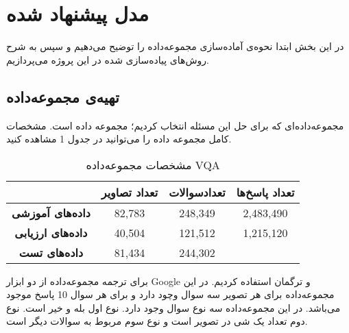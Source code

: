 \section{مدل پیشنهاد شده}
{
	در این بخش ابتدا نحوه‌ی آماده‌سازی مجموعه‌داده را توضیح می‌دهیم و سپس به شرح روش‌های پیاده‌سازی شده در این پروژه می‌پردازیم.
	
	\subsection{تهیه‌ی مجموعه‌داده}
	{
		مجموعه‌داده‌ای که برای حل این مسئله انتخاب کردیم؛ مجموعه داده
		 \href{https://visualqa.org/vqa_v1_download.html}{} 
		 است. مشخصات کامل مجموعه داده را می‌توانید در جدول 1 مشاهده کنید.
		 \begin{table}
			 \begin{center}
			 	\begin{tabular}{ c c c c } 
			 		\hline
			 		& \textbf{تعداد تصاویر} & \textbf{تعدادسوالات} & \textbf{تعداد پاسخ‌ها} \\
			 		\hline \hline
			 		\textbf{داده‌های آموزشی} & 82,783 & 248,349 &  2,483,490 \\
					
					\textbf{داده‌های ارزیابی} & 40,504 & 121,512 & 1,215,120 \\
					
					\textbf{داده‌های تست} & 81,434 & 244,302 & \\
					\hline
			 	\end{tabular}
			 \end{center}
		 \caption{مشخصات مجموعه‌داده VQA}
	 	\end{table}
		برای ترجمه مجموعه‌داده از دو ابزار Google‌ و ترگمان استفاده کردیم. در این مجموعه‌داده برای هر تصویر سه سوال وچود دارد و برای هر سوال 10 پاسخ موجود می‌باشد. در این مجموعه‌داده سه نوع سوال وجود دارد. نوع اول بله و خیر است. نوع دوم تعداد یک شی در تصویر است و نوع سوم مربوط به سوالات دیگر است.
	}
}
